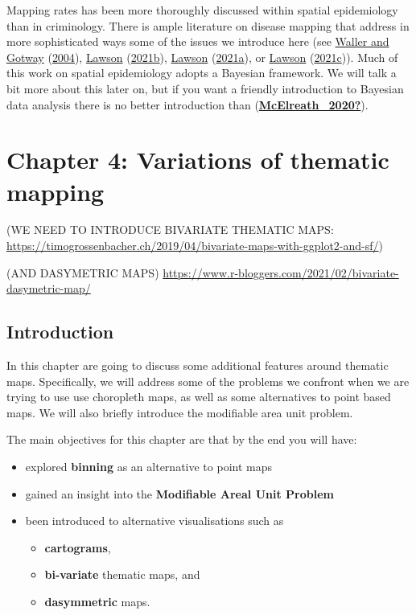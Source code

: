 \documentclass[
]{book}
\providecommand{\tightlist}{%
  \setlength{\itemsep}{0pt}\setlength{\parskip}{0pt}}
\begin{document}
Mapping rates has been more thoroughly discussed within spatial epidemiology than in criminology. There is ample literature on disease mapping that address in more sophisticated ways some of the issues we introduce here (see \protect\hyperlink{ref-Waller_2004}{Waller and Gotway} (\protect\hyperlink{ref-Waller_2004}{2004}), \protect\hyperlink{ref-Lawson_2006}{Lawson} (\protect\hyperlink{ref-Lawson_2006}{2021b}), \protect\hyperlink{ref-Lawson_2021a}{Lawson} (\protect\hyperlink{ref-Lawson_2021a}{2021a}), or \protect\hyperlink{ref-Lawson_2021b}{Lawson} (\protect\hyperlink{ref-Lawson_2021b}{2021c})). Much of this work on spatial epidemiology adopts a Bayesian framework. We will talk a bit more about this later on, but if you want a friendly introduction to Bayesian data analysis there is no better introduction than (\protect\hyperlink{ref-McElreath_2020}{\textbf{McElreath\_2020?}}).

\hypertarget{chapter-4-variations-of-thematic-mapping}{%
\chapter{Chapter 4: Variations of thematic mapping}\label{chapter-4-variations-of-thematic-mapping}}

(WE NEED TO INTRODUCE BIVARIATE THEMATIC MAPS: \url{https://timogrossenbacher.ch/2019/04/bivariate-maps-with-ggplot2-and-sf/})

(AND DASYMETRIC MAPS)
\url{https://www.r-bloggers.com/2021/02/bivariate-dasymetric-map/}

\hypertarget{introduction-4}{%
\section{Introduction}\label{introduction-4}}

In this chapter are going to discuss some additional features around thematic maps. Specifically, we will address some of the problems we confront when we are trying to use use choropleth maps, as well as some alternatives to point based maps. We will also briefly introduce the modifiable area unit problem.

The main objectives for this chapter are that by the end you will have:

\begin{itemize}
\tightlist
\item
  explored \textbf{binning} as an alternative to point maps
\item
  gained an insight into the \textbf{Modifiable Areal Unit Problem}
\item
  been introduced to alternative visualisations such as

  \begin{itemize}
  \tightlist
  \item
    \textbf{cartograms},
  \item
    \textbf{bi-variate} thematic maps, and
  \item
    \textbf{dasymmetric} maps.
  \end{itemize}
\end{itemize}
\end{document}

